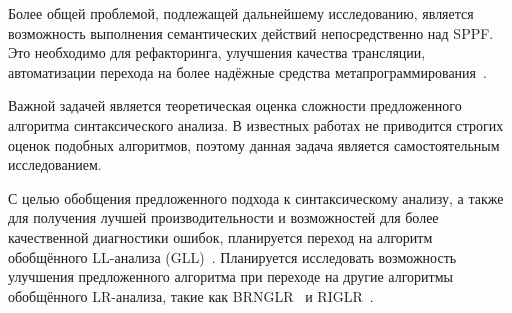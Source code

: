 Более общей проблемой, подлежащей дальнейшему исследованию, является возможность выполнения семантических действий непосредственно над SPPF. Это необходимо для рефакторинга, улучшения качества трансляции, автоматизации перехода на более надёжные средства метапрограммирования~\cite{JSStagedMetaProgramming,JSStagedMetaProgrammingFull}.

Важной задачей является теоретическая оценка сложности предложенного алгоритма синтаксического анализа. В известных работах не приводится строгих оценок подобных алгоритмов, поэтому данная задача является самостоятельным исследованием.

С целью обобщения предложенного подхода к синтаксическому анализу, а также для получения лучшей производительности и возможностей для более качественной диагностики ошибок, планируется переход на алгоритм обобщённого LL-анализа (GLL)~\cite{GLL,AbstractGLL}. Планируется исследовать возможность улучшения предложенного алгоритма при переходе на другие алгоритмы обобщённого LR-анализа, такие как BRNGLR~\cite{BRNGLR} и RIGLR~\cite{RIGLR}.

\clearpage
